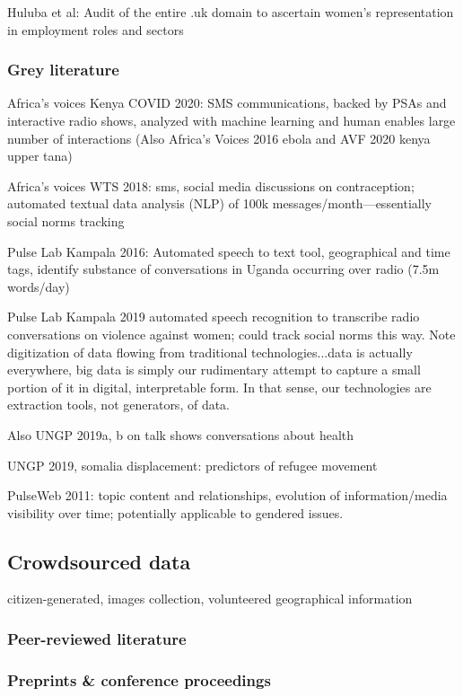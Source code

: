 \documentclass{article}
\begin{document}
Huluba et al: Audit of the entire .uk domain to ascertain women's representation in employment roles and sectors

\subsubsection{Grey literature}

Africa's voices Kenya COVID 2020: SMS communications, backed by PSAs and interactive radio shows, analyzed with machine learning and human enables large number of interactions (Also Africa's Voices 2016 ebola and AVF 2020 kenya upper tana)

Africa's voices WTS 2018: sms, social media discussions on contraception; automated textual data analysis (NLP) of 100k messages/month---essentially social norms tracking

Pulse Lab Kampala 2016: Automated speech to text tool, geographical and time tags, identify substance of conversations in Uganda occurring over radio (7.5m words/day)

Pulse Lab Kampala 2019 automated speech recognition to transcribe radio conversations on violence against women; could track social norms this way. Note digitization of data flowing from traditional technologies...data is actually everywhere, big data is simply our rudimentary attempt to capture a small portion of it in digital, interpretable form. In that sense, our technologies are extraction tools, not generators, of data.

Also UNGP 2019a, b on talk shows conversations about health

UNGP 2019, somalia displacement: predictors of refugee movement

PulseWeb 2011: topic content and relationships, evolution of information/media visibility over time; potentially applicable to gendered issues.

\subsection{Crowdsourced data}
citizen-generated, images collection, volunteered geographical information

\subsubsection{Peer-reviewed literature}
\subsubsection{Preprints \& conference proceedings}
\end{document}
